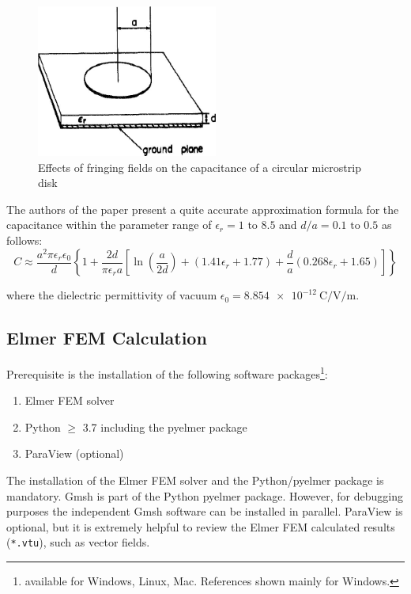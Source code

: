 \documentclass[10pt,a4paper,titlepage]{article}
\begin{document}
	\begin{figure}[H]
		\begin{center}
			\includegraphics[width=!, height=5cm, angle=0]{./fig/disk.jpg}
			\caption{Effects of fringing fields on the capacitance of a circular microstrip disk \cite{1130017}}
			\label{3836149517}
		\end{center}
	\end{figure}
	\noindent
	The authors of the paper \cite{1130017} present a quite accurate approximation formula for the capacitance within the parameter range of $\epsilon_r = 1 \text{ to } 8.5$ and $d/a = 0.1 \text{ to } 0.5$ as follows:
	\begin{equation}
		C \approx \frac{a^2 \pi \epsilon_r \epsilon_0}{d} \left\lbrace  1 + \frac{2d}{\pi \epsilon_r a}   \left[  \ln \left(\frac{a}{2 d}\right) + (1.41 \epsilon_r + 1.77) + \frac{d}{a} (0.268 \epsilon_r + 1.65) \right] \right\rbrace \label{3835945702}	
	\end{equation}
	
	\noindent
	where the dielectric permittivity of vacuum $\epsilon_0 = \SI{8.854e-12}{\coulomb\per\volt\per\meter}$.
	
	\subsection{Elmer FEM Calculation}
	
	
	Prerequisite is the installation of the following software packages\footnote{available for Windows, Linux, Mac. References shown mainly for Windows.}:
	\begin{enumerate}
		\item Elmer FEM solver \cite{ElmerFEM}
		\item Python $\geq$ 3.7 \cite{WinPython} including the pyelmer package \cite{pyelmer}
		\item ParaView \cite{ParaView} (optional)
	\end{enumerate}
	
	\noindent
	The installation of the Elmer FEM solver and the Python/pyelmer package is mandatory. Gmsh is part of the Python pyelmer package. However, for debugging purposes the independent Gmsh software can be installed in parallel.
	ParaView is optional, but it is extremely helpful to review the Elmer FEM calculated results (\verb|*.vtu|), such as vector fields.
	
\end{document}
